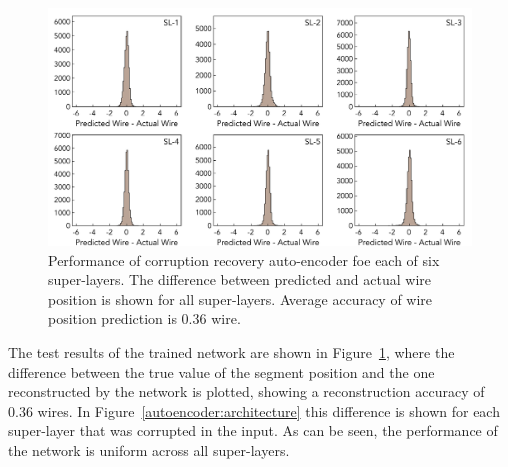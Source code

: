  \begin{figure}[!ht]
\begin{center}
\includegraphics[width=6.0in]{images/encoder_performance.pdf}
\caption {Performance of corruption recovery auto-encoder foe each of six super-layers. The difference between predicted and actual 
wire position is shown for all super-layers. Average accuracy of wire position prediction is  $0.36$ wire.}
 \label{autoencoder:performance}
 \end{center}
\end{figure}

The test results of the trained network are shown in Figure~\ref{autoencoder:performance}, where the 
difference between the true value of the segment position and the one reconstructed by the network is 
plotted, showing a reconstruction accuracy of $0.36$ wires. In Figure~\ref{autoencoder:architecture} 
this difference is shown for each super-layer that was corrupted in the input. As can be seen, 
the performance of the network is uniform across all super-layers.
